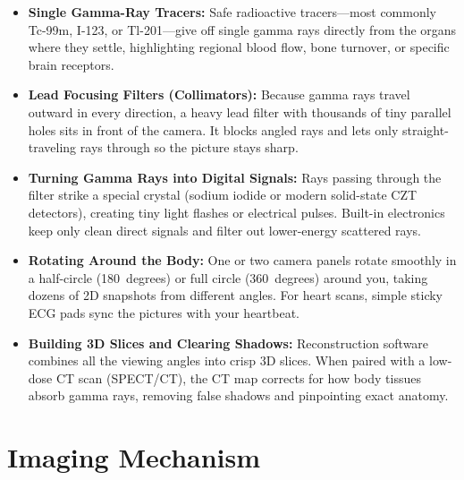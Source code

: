\begin{itemize}
    \item \textbf{Single Gamma-Ray Tracers:} Safe radioactive tracers---most commonly Tc-99m, I-123, or Tl-201---give off single gamma rays directly from the organs where they settle, highlighting regional blood flow, bone turnover, or specific brain receptors.
    \item \textbf{Lead Focusing Filters (Collimators):} Because gamma rays travel outward in every direction, a heavy lead filter with thousands of tiny parallel holes sits in front of the camera. It blocks angled rays and lets only straight-traveling rays through so the picture stays sharp.
    \item \textbf{Turning Gamma Rays into Digital Signals:} Rays passing through the filter strike a special crystal (sodium iodide or modern solid-state CZT detectors), creating tiny light flashes or electrical pulses. Built-in electronics keep only clean direct signals and filter out lower-energy scattered rays.
    \item \textbf{Rotating Around the Body:} One or two camera panels rotate smoothly in a half-circle (180~degrees) or full circle (360~degrees) around you, taking dozens of 2D snapshots from different angles. For heart scans, simple sticky ECG pads sync the pictures with your heartbeat.
    \item \textbf{Building 3D Slices and Clearing Shadows:} Reconstruction software combines all the viewing angles into crisp 3D slices. When paired with a low-dose CT scan (SPECT/CT), the CT map corrects for how body tissues absorb gamma rays, removing false shadows and pinpointing exact anatomy.
\end{itemize}

\section{Imaging Mechanism}

